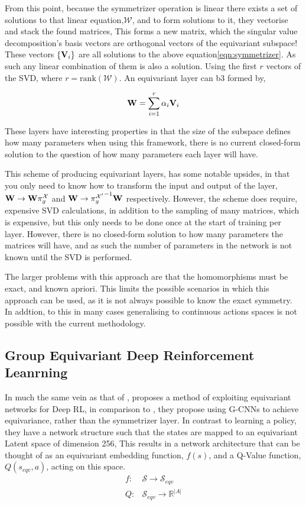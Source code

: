 From this point, because the symmetrizer operation is linear there exists a set of solutions to that linear equation,$\mathcal{W}$, and to form solutions to it, they vectorise and stack the found matrices, This forms a new matrix, which the singular value decomposition's basis vectors are orthogonal vectors of the equivariant subspace! These vectors $\{\mathbf{V}_i\}$ are all solutions to the above equation\ref{eqn:symmetrizer}. As such any linear combination of them is also a solution. Using the first $r$ vectors of the SVD, where $r= \text{rank}(\mathcal{W})$. An equivariant layer can b3 formed by,

\begin{equation}
	\mathbf{W} = \sum_{i=1}^{r}{\alpha_i\mathbf{V}_i}
\end{equation}

These layers have interesting properties in that the size of the subspace defines how many parameters when using this framework, there is no current closed-form solution to the question of how many parameters each layer will have.

This scheme of producing equivariant layers, has some notable upsides, in that you only need to know how to transform the input and output of the layer, $\mathbf{W} \rightarrow \mathbf{W}\pi_g^\mathcal{X}$ and $\mathbf{W} \rightarrow {\pi_g^{\mathcal{X}'}}^{-1} \mathbf{W}$ respectively. However, the scheme does require, expensive SVD calculations, in addition to the sampling of many matrices, which is expensive, but this only needs to be done once at the start of training per layer. However, there is no closed-form solution to how many parameters the matrices will have, and as such the number of parameters in the network is not known until the SVD is performed.

The larger problems with this approach are that the homomorphisms must be exact, and known apriori. This limits the possible scenarios in which this approach can be used, as it is not always possible to know the exact symmetry. In addtion, to this in many cases generalising to continuous actions spaces is not possible with the current methodology.


\subsection{Group Equivariant Deep Reinforcement Leanrning}
In much the same vein as that of \cite{vanderpol2020mdp}, \cite{mondal2020group} proposes a method of exploiting equivariant networks for Deep RL, in comparison to \cite{vanderpol2020mdp}, they propose using G-CNNs \cite{cohen2016group} to achieve equivariance, rather than the symmetrizer layer. In contrast to learning a policy, they have a network structure such that the states are mapped to an equivariant Latent space of dimension 256, This results in a network architecture that can be thought of as an equivariant embedding function, $f(s)$, and a Q-Value function, $Q(s_{eqv}, a)$, acting on this space.
\begin{align}
	f: & \mathcal{S} \rightarrow \mathcal{S}_{eqv}      \\
	Q: & \mathcal{S}_{eqv} \rightarrow \mathbb{R}^{|A|}
\end{align}

